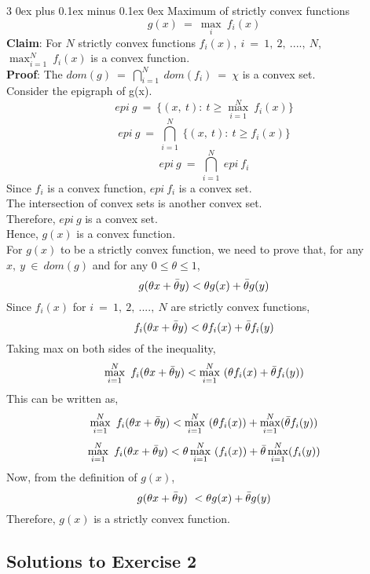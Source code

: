 \documentclass[12pt, draftcls, onecolumn]{IEEEtran}
\makeatletter
\def\subsubsection{\@startsection{subsubsection}%
                                 {3}%
                                 {\z@}%
                                 {0ex plus 0.1ex minus 0.1ex}%
                                 {0ex}%
                                 {\normalfont\normalsize\bfseries}}%
\makeatother
\begin{document}
\subsubsection{Maximum of strictly convex functions}
\[g(x)\ =\ \max_i\ f_i(x)\]
\textbf{Claim}: For $N$ strictly convex functions $f_i(x),\ i\ =\ 1,\ 2,\ ....,\ N$, $\max_{i=1}^N\ f_i(x)$ is a convex function.
\\\textbf{Proof}: The $dom(g)\ =\ \bigcap_{i=1}^N\ dom(f_i)\ =\ \chi$ is a convex set.
\\Consider the epigraph of g(x).
\[epi\ g\ =\ \{(x,\ t):\ t \geq \max_{i=1}^N\ f_i(x)\}\]
\[epi\ g\ =\ \bigcap_{i=1}^N\ \{(x,\ t):\ t \geq f_i(x)\}\]
\[epi\ g\ =\ \bigcap_{i=1}^N\ epi\ f_i\]
Since $f_i$ is a convex function, $epi\ f_i$ is a convex set.
\\The intersection of convex sets is another convex set.
\\Therefore, $epi\ g$ is a convex set.
\\Hence, $g(x)$ is a convex function.
\\For $g(x)$ to be a strictly convex function, we need to prove that, for any $x,\ y\ \in\ dom(g)$ and for any $0 \leq \theta \leq 1$,
\[g(\theta x + \Bar{\theta} y) < \theta g(x) + \Bar{\theta} g(y)\]
Since $f_i(x)$ for $i\ =\ 1,\ 2,\ ....,\ N$ are strictly convex functions,
\[f_i(\theta x + \Bar{\theta} y) < \theta f_i(x) + \Bar{\theta} f_i(y)\]
Taking max on both sides of the inequality,
\[\max_{i=1}^N\ f_i(\theta x + \Bar{\theta} y) < \max_{i=1}^N\ (\theta f_i(x) + \Bar{\theta} f_i(y))\]
This can be written as,
\[\max_{i=1}^N\ f_i(\theta x + \Bar{\theta} y) < \max_{i=1}^N\ (\theta f_i(x)) + \max_{i=1}^N(\Bar{\theta} f_i(y))\]
\[\max_{i=1}^N\ f_i(\theta x + \Bar{\theta} y) < \theta \max_{i=1}^N\ (f_i(x)) + \Bar{\theta} \max_{i=1}^N(f_i(y))\]
Now, from the definition of $g(x)$,
\[g(\theta x + \Bar{\theta} y)\ < \theta g(x) + \Bar{\theta} g(y)\]
Therefore, $g(x)$ is a strictly convex function.
\subsection{Solutions to Exercise 2}
\end{document}
